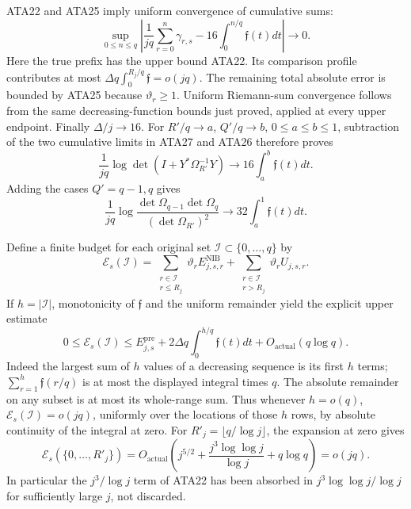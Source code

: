 \documentclass[11pt,a4paper]{article}
\begin{document}
ATA22 and ATA25 imply uniform convergence of cumulative sums:
\[
 \sup_{0\le n\le q}
 \left|\frac1{jq}\sum_{r=0}^n\gamma_{r,s}
             -16\int_0^{n/q}\mathfrak f(t)dt\right|\longrightarrow0.
                                                               \tag{ATA27}
\]
Here the true prefix has the upper bound ATA22.  Its comparison
profile contributes at most
$\Delta q\int_0^{R_j/q}\mathfrak f=o(jq)$.
The remaining total absolute error is bounded by ATA25 because
$\vartheta_r\ge1$.  Uniform Riemann-sum convergence follows from
the same decreasing-function bounds just proved, applied at every
upper endpoint.  Finally $\Delta/j\to16$.
For $R'/q\to a$, $Q'/q\to b$, $0\le a\le b\le1$, subtraction
of the two cumulative limits in ATA27 and ATA26 therefore proves
\[
 \frac{1}{jq}\log\det(I+Y^*\Omega_{R'}^{-1}Y)
                   \longrightarrow16\int_a^b\mathfrak f(t)dt.
                                                               \tag{ATA28}
\]
Adding the cases $Q'=q-1,q$ gives
\[
 \frac1{jq}\log\frac{\det\Omega_{q-1}\det\Omega_q}
                       {(\det\Omega_{R'})^2}
                   \longrightarrow32\int_a^1\mathfrak f(t)dt.
                                                               \tag{ATA29}
\]

Define a finite budget for each original set
$\mathscr I\subset\{0,\ldots,q\}$ by
\[
 \mathcal E_s(\mathscr I)
 =\sum_{\substack{r\in\mathscr I\\r\le R_j}}
       \vartheta_rE^{\mathrm{NIB}}_{j,s,r}
  +\sum_{\substack{r\in\mathscr I\\r>R_j}}
       \vartheta_rU_{j,s,r}.                            \tag{ATA30}
\]
If $h=|\mathscr I|$, monotonicity of $\mathfrak f$ and the uniform
remainder yield the explicit upper estimate
\[
 0\le\mathcal E_s(\mathscr I)
 \le E^{\mathrm{pre}}_{j,s}
   +2\Delta q\int_0^{h/q}\mathfrak f(t)dt
   +O_{\mathrm{actual}}(q\log q).                      \tag{ATA31}
\]
Indeed the largest sum of $h$ values of a decreasing sequence is its
first $h$ terms; $\sum_{r=1}^h\mathfrak f(r/q)$ is at most the
displayed integral times $q$.  The absolute remainder on any subset
is at most its whole-range sum.  Thus whenever $h=o(q)$,
$\mathcal E_s(\mathscr I)=o(jq)$, uniformly over the locations of
those $h$ rows, by absolute continuity of the integral at zero.
For $R'_j=\lfloor q/\log j\rfloor$, the expansion at zero gives
\[
 \mathcal E_s(\{0,\ldots,R'_j\})
 =O_{\mathrm{actual}}\left(j^{5/2}
          +\frac{j^3\log\log j}{\log j}+q\log q\right)=o(jq).
                                                               \tag{ATA32}
\]
In particular the $j^3/\log j$ term of ATA22 has been absorbed in
$j^3\log\log j/\log j$ for sufficiently large $j$, not discarded.
\end{document}
